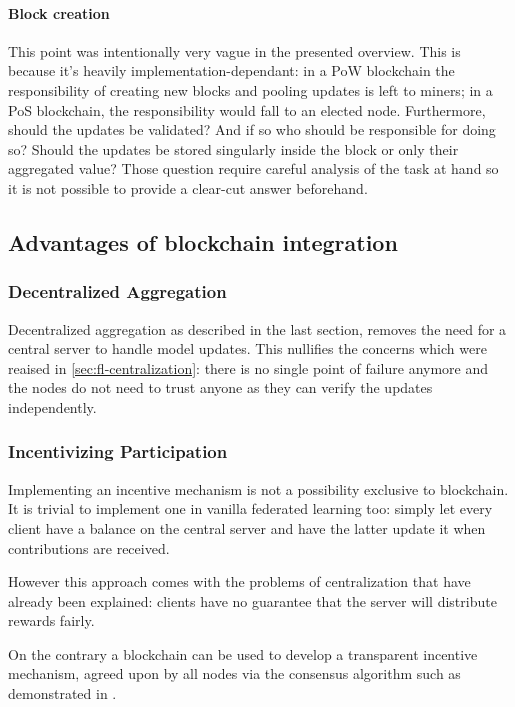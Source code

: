 \paragraph{Block creation} This point was intentionally very vague in the presented overview.
This is because it's heavily implementation-dependant: in a PoW blockchain the responsibility of
creating new blocks and pooling updates is left to miners; in a PoS blockchain, the responsibility would fall
to an elected node.
Furthermore, should the updates be validated? And if so who should be responsible for doing so?
Should the updates be stored singularly inside the block or only their aggregated value?
Those question require careful analysis of the task at hand so it is not possible to provide a clear-cut
answer beforehand.

\subsection{Advantages of blockchain integration}\label{subsec:advantages-blockchain-fl}
\subsubsection{Decentralized Aggregation}
Decentralized aggregation as described in the last section, removes the need for a central server to handle
model updates. This nullifies the concerns which were reaised in \ref{sec:fl-centralization}: there is no
single point of
failure anymore and the nodes do not need to trust anyone as they can verify the updates independently.

\subsubsection{Incentivizing Participation}
Implementing an incentive mechanism is not a possibility exclusive to blockchain.
It is trivial to implement one in vanilla federated learning too:
simply let every client have a balance on the central server and have the latter update it when contributions
are received.

However this approach comes with the problems of centralization that have already been explained: clients
have no guarantee that the server will distribute rewards fairly.

On the contrary a blockchain can be used to develop a transparent incentive mechanism, agreed upon by all
nodes via the consensus algorithm such as demonstrated in \cite{FlwrBC}.

